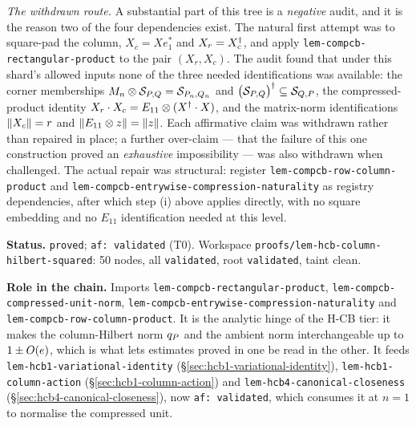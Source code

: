 \emph{The withdrawn route.} A substantial part of this tree is a \emph{negative} audit,
and it is the reason two of the four dependencies exist. The natural first attempt was to
square-pad the column, $X_c=Xe_1^{*}$ and $X_r=X_c^{\dagger}$, and apply
\texttt{lem-compcb-rectangular-product} to the pair $(X_r,X_c)$. The audit found that
under this shard's allowed inputs none of the three needed identifications was available:
the corner memberships $M_{n}\otimes \mathcal S_{P,Q}=\mathcal S_{P_n,Q_n}$ and
$\bigl(\mathcal S_{P,Q}\bigr)^{\dagger}\subseteq\mathcal S_{Q,P}$, the compressed-product identity
$X_r\mathbin{\cdot} X_c=E_{11}\otimes(X^{\dagger}\mathbin{\cdot} X)$, and the matrix-norm identifications
$\lVert X_c\rVert=r$ and $\lVert E_{11}\otimes z\rVert=\lVert z\rVert$. Each affirmative claim was withdrawn
rather than repaired in place; a further over-claim --- that the failure of this one
construction proved an \emph{exhaustive} impossibility --- was also withdrawn when
challenged. The actual repair was structural: register
\texttt{lem-compcb-row-column-product} and
\texttt{lem-compcb-entrywise-compression-naturality} as registry dependencies, after which
step (i) above applies directly, with no square embedding and no $E_{11}$ identification
needed at this level.

\medskip
\noindent\textbf{Status.} \texttt{proved}; \texttt{af: validated} (T0). Workspace
\texttt{proofs/lem-hcb-column-hilbert-squared}: 50 nodes, all \texttt{validated}, root
\texttt{validated}, taint clean.

\noindent\textbf{Role in the chain.} Imports
\texttt{lem-compcb-rectangular-product},
\texttt{lem-compcb-compressed-unit-norm},
\texttt{lem-compcb-entrywise-compression-naturality} and
\texttt{lem-compcb-row-column-product}. It is the analytic hinge of the H-CB tier: it
makes the column-Hilbert norm $q_{P}$ and the ambient norm interchangeable up to
$1\pm O(e)$, which is what lets estimates proved in one be read in the other. It feeds
\texttt{lem-hcb1-variational-identity} (\S\ref{sec:hcb1-variational-identity}),
\texttt{lem-hcb1-column-action} (\S\ref{sec:hcb1-column-action}) and
\texttt{lem-hcb4-canonical-closeness} (\S\ref{sec:hcb4-canonical-closeness}), now
\texttt{af: validated}, which consumes it at $n=1$ to normalise the compressed unit.
